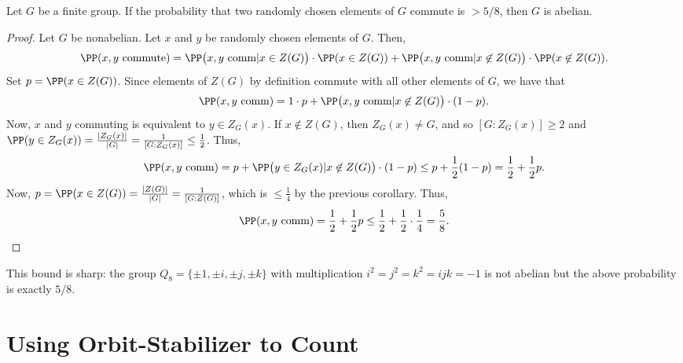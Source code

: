 \documentclass{article}
\begin{document}
\begin{thm*} Let $G$ be a finite group. If the probability that two randomly chosen elements of $G$ commute is $>5/8$, then $G$ is abelian.\end{thm*}
\begin{proof} Let $G$ be nonabelian. Let $x$ and $y$ be randomly chosen elements of $G$. Then,
$$\PP(x,y\text{ commute})=\PP\big(x,y\text{ comm}|x\in Z(G)\big)\cdot\PP(x\in Z(G))+\PP\big(x,y\text{ comm}|x\not\in Z(G)\big)\cdot\PP(x\not\in Z(G)).$$
Set $p=\PP(x\in Z(G))$. Since elements of $Z(G)$ by definition commute with all other elements of $G$, we have that
$$\PP(x,y\text{ comm})=1\cdot p+\PP\big(x,y\text{ comm}|x\not\in Z(G)\big)\cdot(1-p).$$
Now, $x$ and $y$ commuting is equivalent to $y\in Z_G(x)$. If $x\not\in Z(G)$, then $Z_G(x)\neq G$, and so $[G:Z_G(x)]\geq 2$ and $\PP(y\in Z_G(x))=\frac{|Z_G(x)|}{|G|}=\frac{1}{[G:Z_G(x)]}\leq\frac{1}{2}$. Thus,
$$\PP(x,y\text{ comm})=p+\PP\big(y\in Z_G(x)|x\not\in Z(G)\big)\cdot (1-p)\leq p+\frac{1}{2}(1-p)=\frac{1}{2}+\frac{1}{2}p.$$
Now, $p=\PP(x\in Z(G))=\frac{|Z(G)|}{|G|}=\frac{1}{[G:Z(G)]}$, which is $\leq\frac{1}{4}$ by the previous corollary. Thus,
$$\PP(x,y\text{ comm})=\frac{1}{2}+\frac{1}{2}p\leq \frac{1}{2}+\frac{1}{2}\cdot\frac{1}{4}=\frac{5}{8}.$$
\end{proof}

This bound is sharp: the group $Q_8=\{\pm 1, \pm i, \pm j, \pm k\}$ with multiplication $i^2=j^2=k^2=ijk=-1$ is not abelian but the above probability is exactly $5/8$.

\pagebreak

\section{Using Orbit-Stabilizer to Count}
\end{document}
